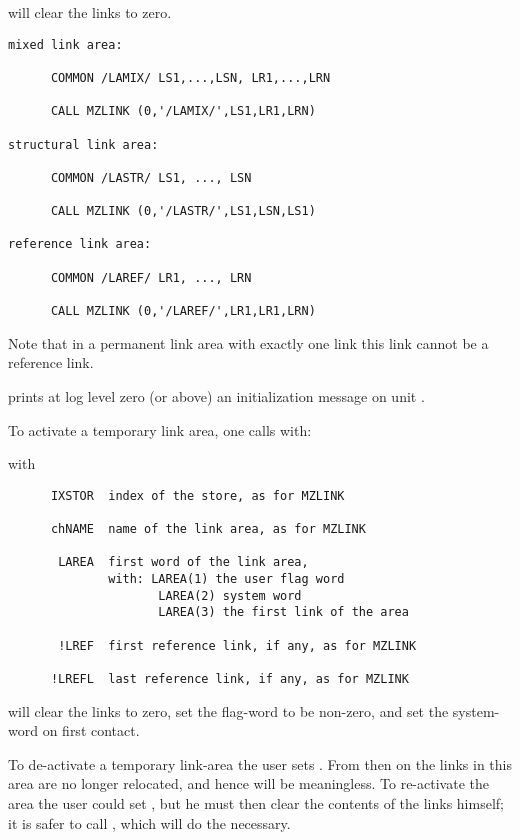  will clear the links to zero.

\Examples

\begin{verbatim}
mixed link area:

      COMMON /LAMIX/ LS1,...,LSN, LR1,...,LRN

      CALL MZLINK (0,'/LAMIX/',LS1,LR1,LRN)

structural link area:

      COMMON /LASTR/ LS1, ..., LSN

      CALL MZLINK (0,'/LASTR/',LS1,LSN,LS1)

reference link area:

      COMMON /LAREF/ LR1, ..., LRN

      CALL MZLINK (0,'/LAREF/',LR1,LR1,LRN)
\end{verbatim} 

Note that in a permanent link area with exactly one link
this link cannot be a reference link.

 prints at log level zero (or above) an initialization
message on unit .

To activate a temporary link area, one calls with:


with
\begin{verbatim}
      IXSTOR  index of the store, as for MZLINK

      chNAME  name of the link area, as for MZLINK

       LAREA  first word of the link area,
              with: LAREA(1) the user flag word
                     LAREA(2) system word
                     LAREA(3) the first link of the area

       !LREF  first reference link, if any, as for MZLINK

      !LREFL  last reference link, if any, as for MZLINK
\end{verbatim} 

 will clear the links to zero,
set the flag-word  to be non-zero,
and set the system-word  on first contact.

To de-activate a temporary link-area the user sets .
From then on the links in this area are no longer relocated,
and hence will be meaningless.
To re-activate the area the user could set ,
but he must then clear the contents of the links himself;
it is safer to call , which will do the necessary.

